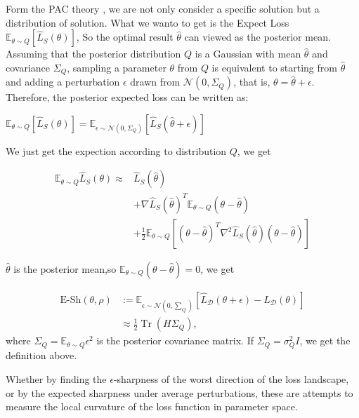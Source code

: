 \documentclass[letterpaper]{article} %
\begin{document}
Form the PAC theory , we are not only consider a specific solution but a distribution of solution. What we wanto to get is the Expect Loss $\mathbb{E}_{\theta \sim Q}[\widehat{L}_{S}(\theta)]$, So the optimal result $\hat{\theta}$ can viewed as the posterior mean. Assuming that the posterior distribution $Q$ is a Gaussian with mean $\hat{\theta}$ and covariance $\Sigma_Q$, sampling a parameter $\theta$ from $Q$ is equivalent to starting from $\hat{\theta}$ and adding a perturbation $\epsilon$ drawn from $\mathcal{N}(0, \Sigma_Q)$, that is, $\theta = \hat{\theta} + \epsilon$.
 Therefore, the posterior expected loss can be written as:

$\mathbb{E}_{\theta \sim Q}[\hat{L}_S(\theta)] = \mathbb{E}_{\epsilon \sim \mathcal{N}(0, \Sigma_Q)}[\hat{L}_S(\hat{\theta} + \epsilon)]$

We just get the expection according to distribution $Q$, we get 

\begin{equation}
\begin{aligned}
\mathbb{E}_{\theta \sim Q}\widehat{L}_S(\theta) \approx
        & \widehat{L}_S(\hat{\theta}) \\
        &+\nabla \widehat{L}_S(\hat{\theta})^T\mathbb{E}_{\theta \sim Q}(\theta-\hat{\theta}) \\
        &+\frac{1}{2}\mathbb{E}_{\theta \sim Q}[(\theta-\hat{\theta})^T \nabla^2 \widehat{L}_S(\hat{\theta})(\theta-\hat{\theta})]
\end{aligned}
\end{equation}

 
 $\hat{\theta}$ is the posterior mean,so $\mathbb{E}_{\theta \sim Q}(\theta-\hat{\theta})=0 $, we get 


 
\begin{equation}
\begin{aligned}\label{eq: relation exp sharpness}
    \text{E-Sh}(\theta,\rho) 
    &:= \mathbb{E}_{\epsilon \sim \mathcal{N}(0,\sum_Q)}  \left[ \hat{L}_{\mathcal{D}}(\theta + \epsilon) - \hat{L}_{\mathcal{D}}(\theta) \right]   \\
    & \approx\frac{1}{2} \operatorname{Tr}\left(H \Sigma_Q\right),  
\end{aligned}
\end{equation}
where  $\Sigma_Q=\mathbb{E}_{\theta \sim Q}\epsilon^2$ is the posterior covariance matrix. If $\Sigma_Q = \sigma_Q^2 I$, we get the definition above.

Whether by finding the $\epsilon$-sharpness of the worst direction of the loss landscape, or by the expected sharpness under average perturbations, these are attempts to measure the local curvature of the loss function in parameter space.
\end{document}

